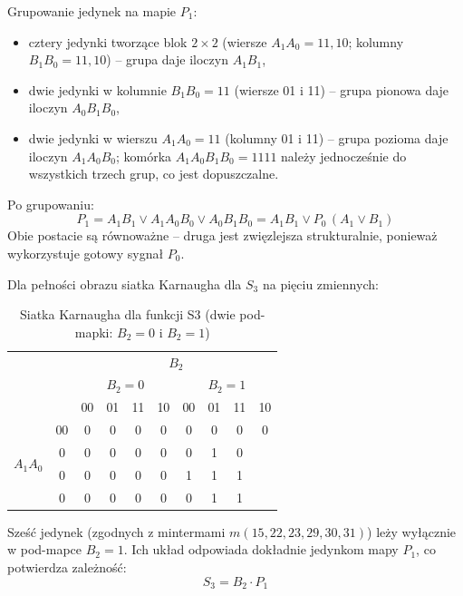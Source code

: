 \documentclass[11pt]{article}
\begin{document}
Grupowanie jedynek na mapie \(P_1\):
\begin{itemize}
    \item cztery jedynki tworzące blok \(2\times2\) (wiersze \(A_1A_0 = 11, 10\); kolumny \(B_1B_0 = 11, 10\)) -- grupa daje iloczyn \(A_1 B_1\),
    \item dwie jedynki w kolumnie \(B_1B_0=11\) (wiersze 01 i 11) -- grupa pionowa daje iloczyn \(A_0 B_1 B_0\),
    \item dwie jedynki w wierszu \(A_1A_0=11\) (kolumny 01 i 11) -- grupa pozioma daje iloczyn \(A_1 A_0 B_0\); komórka \(A_1A_0B_1B_0=1111\) należy jednocześnie do wszystkich trzech grup, co jest dopuszczalne.
\end{itemize}

Po grupowaniu:
\begin{equation}
P_1 = A_1 B_1 \lor A_1 A_0 B_0 \lor A_0 B_1 B_0
     = A_1 B_1 \lor P_0\,(A_1 \lor B_1)
\end{equation}
Obie postacie są równoważne -- druga jest zwięzlejsza strukturalnie, ponieważ wykorzystuje gotowy sygnał \(P_0\).

Dla pełności obrazu siatka Karnaugha dla \(S_3\) na pięciu zmiennych:
\begin{table}[H]
\centering
\caption{Siatka Karnaugha dla funkcji S3 (dwie pod-mapki: $B_2=0$ i $B_2=1$)}
\label{tab:kmap_S3}
\setlength{\tabcolsep}{5.5pt}
\begin{tabular}{cc|c|c|c|c|c|c|c|c}
\multicolumn{2}{c}{} & \multicolumn{8}{c}{$B_2$} \\
\multicolumn{2}{c}{} & \multicolumn{4}{c}{$B_2=0$} & \multicolumn{4}{c}{$B_2=1$} \\
\multicolumn{2}{c}{} & 00 & 01 & 11 & 10 & 00 & 01 & 11 & 10 \\
\hline
\multirow{4}{*}{$A_1A_0$} & 00 & 0 & 0 & 0 & 0 & 0 & 0 & 0 & 0 \\
01 & 0 & 0 & 0 & 0 & 0 & 0 & 1 & 0 \\
11 & 0 & 0 & 0 & 0 & 0 & 1 & 1 & 1 \\
10 & 0 & 0 & 0 & 0 & 0 & 0 & 1 & 1 \\
\hline
\end{tabular}
\end{table}

Sześć jedynek (zgodnych z mintermami \(m(15,22,23,29,30,31)\)) leży wyłącznie w pod-mapce \(B_2=1\). Ich układ odpowiada dokładnie jedynkom mapy \(P_1\), co potwierdza zależność:
\begin{equation}
S_3 = B_2 \cdot P_1
\end{equation}
\end{document}
